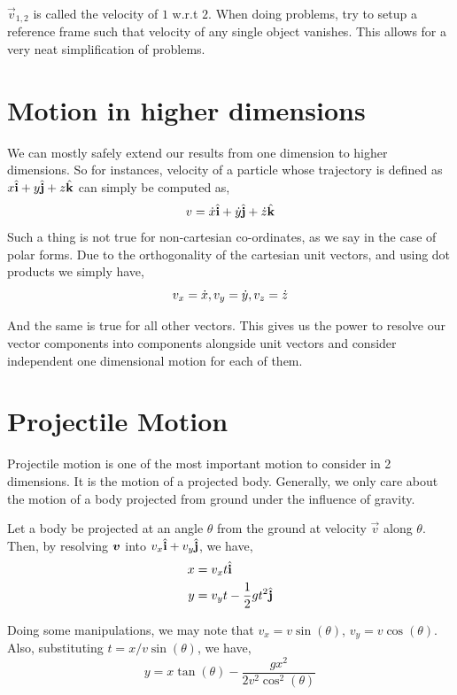 \(\vec{v}_{1,2}\) is called the velocity of \(\mathit{1}\) w.r.t \(\mathit{2}\). When doing
problems, try to setup a reference frame such that velocity of any single object vanishes.
This allows for a very neat simplification of problems. 

\section{Motion in higher dimensions}

We can mostly safely extend our results from one dimension to higher dimensions.
So for instances, velocity of a particle whose trajectory is defined as 
\(x{\hat{\boldsymbol{\mathbf{i}}}} + y{\hat{\boldsymbol{\mathbf{j}}}} + z{\hat{\boldsymbol{\mathbf{k}}}}\) can simply be computed as,
\[v = \dot{x}{\hat{\boldsymbol{\mathbf{i}}}} + \dot{y}{\hat{\boldsymbol{\mathbf{j}}}} + \dot{z}{\hat{\boldsymbol{\mathbf{k}}}}\] Such a thing
is not true for non-cartesian co-ordinates, as we say in the case of polar forms.
Due to the orthogonality of the cartesian unit vectors, and using dot products
we simply have, 
\[v_x = \dot{x}, v_y = \dot{y}, v_z = \dot{z}\]

And the same is true for all other vectors. This gives us the power to
resolve our vector components into components alongside unit vectors
and consider independent one dimensional motion for each of them.

\section{Projectile Motion}

Projectile motion is one of the most important motion to consider in 
2 dimensions. It is the motion of a projected body. Generally, we
only care about the motion of a body projected from ground under the influence
of gravity. 

Let a body be projected at an angle \(\theta\) from the ground at velocity \(\vec{v}\)
along \(\theta\). Then, by resolving \(\boldsymbol{v}\) into \(v_x {\hat{\boldsymbol{\mathbf{i}}}} + v_y{\hat{\boldsymbol{\mathbf{j}}}}\),
we have, 
\begin{align*}
    x &= v_xt {\hat{\boldsymbol{\mathbf{i}}}} \\
    y &= v_yt - \frac{1}{2}gt^2 {\hat{\boldsymbol{\mathbf{j}}}}
\end{align*}

Doing some manipulations, we may note that \(v_x = v\sin(\theta)\), \(v_y = v\cos(\theta)\).
Also, substituting \(t = x/v\sin(\theta)\), we have,
\begin{equation}
    \boxed{y = x\tan(\theta) - \frac{gx^2}{2v^2\cos^2(\theta)}}
\end{equation}

